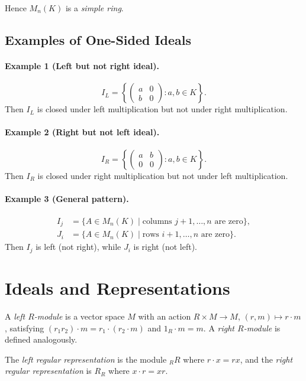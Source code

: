 \begin{remark}
Hence $M_n(K)$ is a \emph{simple ring}.
\end{remark}

\subsection{Examples of One-Sided Ideals}

\paragraph{Example 1 (Left but not right ideal).}
\[
I_L = 
\left\{
\begin{pmatrix}
a & 0 \\[2pt]
b & 0
\end{pmatrix}
: a,b\in K
\right\}.
\]
Then $I_L$ is closed under left multiplication but not under right multiplication.

\paragraph{Example 2 (Right but not left ideal).}
\[
I_R = 
\left\{
\begin{pmatrix}
a & b \\[2pt]
0 & 0
\end{pmatrix}
: a,b\in K
\right\}.
\]
Then $I_R$ is closed under right multiplication but not under left multiplication.

\paragraph{Example 3 (General pattern).}
\begin{align*}
I_j &= \{A\in M_n(K)\mid \text{columns } j+1,\dots,n\text{ are zero}\}, \\
J_i &= \{A\in M_n(K)\mid \text{rows } i+1,\dots,n\text{ are zero}\}.
\end{align*}
Then $I_j$ is left (not right), while $J_i$ is right (not left).

\section{Ideals and Representations}

\begin{definition}
A \emph{left $R$-module} is a vector space $M$ with an action $R\times M\to M$, $(r,m)\mapsto r\cdot m$,  
satisfying $(r_1r_2)\cdot m=r_1\cdot(r_2\cdot m)$ and $1_R\cdot m=m$.  
A \emph{right $R$-module} is defined analogously.

The \emph{left regular representation} is the module ${}_R R$ where $r\cdot x=rx$,  
and the \emph{right regular representation} is $R_R$ where $x\cdot r=xr$.
\end{definition}

